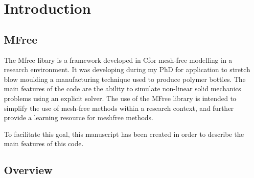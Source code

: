 \chapter{Introduction}
\section{MFree}
The Mfree libary is a framework developed in Cfor mesh-free modelling in a research environment. It was developing during my PhD for application to stretch blow moulding a manufacturing technique used to produce polymer bottles. The main features of the code are the ability to simulate non-linear solid mechanics problems using an explicit solver. The use of the MFree library is intended to simplify the use of mesh-free methods within a research context, and further provide a learning resource for meshfree methods. 

To facilitate this goal, this manuscript has been created in order to describe the main features of this code.
\section{Overview}



